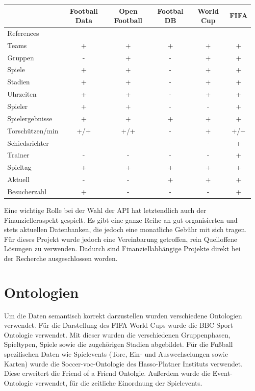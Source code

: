 \documentclass[runningheads,a4paper]{llncs}
\begin{document}
\begin{center}

\begin{tabular}{|l|c|c|c|c|c|}   \hline 
 & Football Data 	& Open Football 	& Footbal DB  &	World Cup  & FIFA  \\ \hline
References & \cite{url_footballdata} & \cite{url_openfootball} &  \cite{url_footballdb} &
 \cite{url_worldcup} & \cite{url_fifa} \\ \hline
 
Teams				& + & + & +	& + & +		\\ \hline
Gruppen				& - & + & -	& + & +		\\ \hline
Spiele				& + & + & -	& + & +		\\ \hline
Stadien				& + & + & -	& + & +		\\ \hline
Uhrzeiten			& + & + & -	& + & +		\\ \hline
Spieler				& + & + & - & - & +		\\ \hline
Spielergebnisse		& + & + & + & + & + 		\\ \hline
Torschützen/min		& +/+ & 	+/+ & - & + & +/+ 	\\ \hline
Schiedsrichter		& - & - & - & - & +		\\ \hline
Trainer				& - & - & - & - & +		\\ \hline
Spieltag 			& + & + & + & + & +		\\ \hline
Aktuell				& - & - & + & + & +  \\ \hline
Besucherzahl			& + & - & - & - & +		\\ \hline
			 
\end{tabular}


\end{center}


Eine wichtige Rolle bei der Wahl der API hat letztendlich auch der Finanzielleraspekt gespielt. Es gibt eine ganze Reihe an gut organisierten und stets aktuellen Datenbanken, die jedoch eine monatliche Gebühr mit sich tragen. Für dieses Projekt wurde jedoch eine Vereinbarung getroffen, rein Quelloffene Lösungen zu verwenden. Dadurch sind Finanziellabhängige Projekte direkt bei der Recherche ausgeschlossen worden. 
  
\newpage
\section{Ontologien}
Um die Daten semantisch korrekt darzustellen wurden verschiedene Ontologien verwendet. Für die Darstellung des FIFA World-Cups wurde die BBC-Sport-Ontologie verwendet. Mit dieser wurden die verschiedenen Gruppenphasen, Spieltypen, Spiele sowie die zugehörigen Stadien abgebildet. Für die Fußball spezifischen Daten wie Spielevents (Tore, Ein- und Auswechselungen sowie Karten) wurde die Soccer-voc-Ontologie des Hasso-Platner Instituts verwendet. Diese erweitert die Friend of a Friend Ontolgie. Außerdem wurde die Event-Ontologie verwendet, für die zeitliche Einordnung der Spielevents.
\end{document}
